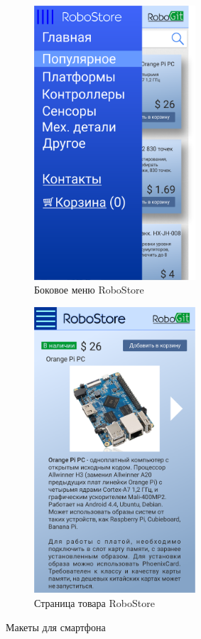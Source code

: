 \documentclass[12pt, a4paper]{article}
\begin{document}
\begin{figure}
  \centering
  \begin{subfigure}[b]{0.47\textwidth}
    \includegraphics[width=6cm]{png/store_menu_smart.png}
    \caption{Боковое меню RoboStore}
  \end{subfigure}
  \begin{subfigure}[b]{0.47\textwidth}
    \includegraphics[width=6cm]{png/store_item_smart.png}
    \caption{Страница товара RoboStore}
  \end{subfigure}
  \caption{Макеты для смартфона }
\end{figure}
\end{document}

